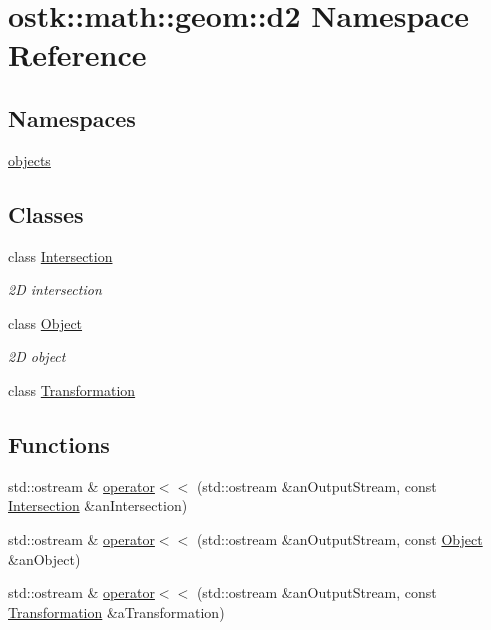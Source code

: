 \hypertarget{namespaceostk_1_1math_1_1geom_1_1d2}{}\section{ostk\+:\+:math\+:\+:geom\+:\+:d2 Namespace Reference}
\label{namespaceostk_1_1math_1_1geom_1_1d2}
\subsection*{Namespaces}
\begin{DoxyCompactItemize}
\item 
 \hyperlink{namespaceostk_1_1math_1_1geom_1_1d2_1_1objects}{objects}
\end{DoxyCompactItemize}
\subsection*{Classes}
\begin{DoxyCompactItemize}
\item 
class \hyperlink{classostk_1_1math_1_1geom_1_1d2_1_1_intersection}{Intersection}
\begin{DoxyCompactList}\small\item\em 2D intersection \end{DoxyCompactList}\item 
class \hyperlink{classostk_1_1math_1_1geom_1_1d2_1_1_object}{Object}
\begin{DoxyCompactList}\small\item\em 2D object \end{DoxyCompactList}\item 
class \hyperlink{classostk_1_1math_1_1geom_1_1d2_1_1_transformation}{Transformation}
\end{DoxyCompactItemize}
\subsection*{Functions}
\begin{DoxyCompactItemize}
\item 
std\+::ostream \& \hyperlink{namespaceostk_1_1math_1_1geom_1_1d2_a5b9fba99bba59f398e4c8d9800c2b139}{operator$<$$<$} (std\+::ostream \&an\+Output\+Stream, const \hyperlink{classostk_1_1math_1_1geom_1_1d2_1_1_intersection}{Intersection} \&an\+Intersection)
\item 
std\+::ostream \& \hyperlink{namespaceostk_1_1math_1_1geom_1_1d2_a810b45a7a36ac746e594df799b6c0d64}{operator$<$$<$} (std\+::ostream \&an\+Output\+Stream, const \hyperlink{classostk_1_1math_1_1geom_1_1d2_1_1_object}{Object} \&an\+Object)
\item 
std\+::ostream \& \hyperlink{namespaceostk_1_1math_1_1geom_1_1d2_af5bcbd713b1bc06beb1eaa22e759fb33}{operator$<$$<$} (std\+::ostream \&an\+Output\+Stream, const \hyperlink{classostk_1_1math_1_1geom_1_1d2_1_1_transformation}{Transformation} \&a\+Transformation)
\end{DoxyCompactItemize}



